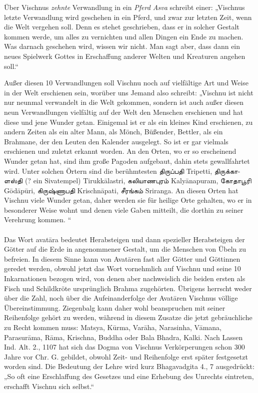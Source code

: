 \documentclass{article}
\newcommand{\TamilText}[1]{\texttamil{#1}}
\newcommand{\tam}[1]{\TamilText{#1}}
\begin{document}
Über Vischnus \emph{zehnte} Verwandlung in ein \emph{Pferd Asva} schreibt einer: „Vischnus letzte Verwandlung wird geschehen in ein Pferd, und zwar zur letzten Zeit, wenn die Welt vergehen soll. Denn es stehet geschrieben, dass er in solcher Gestalt kommen werde, um alles zu vernichten und allen Dingen ein Ende zu machen. Was darnach geschehen wird, wissen wir nicht. Man sagt aber, dass dann ein neues Spielwerk Gottes in Erschaffung anderer Welten und Kreaturen angehen soll.“

Außer diesen 10 Verwandlungen soll Vischnu noch auf vielfältige Art und Weise in der Welt erschienen sein, worüber uns Jemand also schreibt: „Vischnu ist nicht nur neunmal verwandelt in die Welt gekommen, sondern ist auch außer diesen neun Verwandlungen vielfältig auf der Welt den Menschen erschienen und hat diese und jene Wunder getan. Einigemal ist er als ein kleines Kind erschienen, zu andern Zeiten als ein alter Mann, als Mönch, Büßender, Bettler, als ein Brahmane, der den Leuten den Kalender ausgelegt. So ist er gar vielmals erschienen und zuletzt erkannt worden. An den Orten, wo er so erscheinend Wunder getan hat, sind ihm große Pagoden aufgebaut, dahin stets gewallfahrtet wird. Unter solchen Örtern sind die berühmtesten \tam{திருப்பதி} Tripetti, \tam{திருக்காளஸ்தி} (? ein Sivatempel) Tirukk\={a}lastri, \tam{கலியாணபுரம்} Kaly\={a}napuram, \tam{கோதாபூரி} G\={o}d\={a}p\={u}ri, \tam{கிருஷ்ணாபதி} Krischn\={a}pati, \tam{சீரங்கம்} Sriranga. An diesen Orten hat Vischnu viele Wunder getan, daher werden sie für heilige Orte gehalten, wo er in besonderer Weise wohnt und denen viele Gaben mitteilt, die dorthin zu seiner Verehrung kommen. “

\begin{center}
\end{center}
\paragraph{}
Das Wort avat\={a}ra bedeutet Herabsteigen und dann spezieller Herabsteigen der Götter auf die Erde in angenommener Gestalt, um die Menschen von Übeln zu befreien. In diesem Sinne kann von Avat\={a}ren fast aller Götter und Göttinnen geredet werden, obwohl jetzt das Wort vornehmlich auf Vischnu und seine 10 Inkarnationen bezogen wird, von denen aber nachweislich die beiden ersten als Fisch und Schildkröte ursprünglich Brahma zugehörten. Übrigens herrscht weder über die Zahl, noch über die Aufeinanderfolge der Avat\={a}ren Vischnus völlige Übereinstimmung. Ziegenbalg kann daher wohl beanspruchen mit seiner Reihenfolge gehört zu werden, während in diesem Zusatze die jetzt gebräuchliche zu Recht kommen muss: Matsya, K\={u}rma, Var\={a}ha, Narasinha, V\={a}mana, Parasur\={a}ma, R\={a}ma, Krischna, Buddha oder Bala Bhadra, Kalki. Nach Lassen Ind. Alt. 2., 1107 hat sich das Dogma von Vischnus Verkörperungen schon 300 Jahre vor Chr. G. gebildet, obwohl Zeit- und Reihenfolge erst später festgesetzt worden sind. Die Bedeutung der Lehre wird kurz Bhagavadgita 4., 7 ausgedrückt: „So oft eine Erschlaffung des Gesetzes und eine Erhebung des Unrechts eintreten, erschafft Vischnu sich selbst.“
\end{document}
